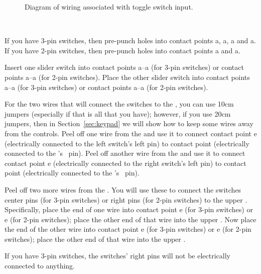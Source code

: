 \begin{figure}[p]
{{        }
    }{}
    \caption{Diagram of wiring associated with toggle switch input.
        \label{fig:switch-diagram}}
\end{figure}

\disconnect\

If you have 3-pin switches, then pre-punch holes into contact points a, a, a and a.
If you have 2-pin switches, then pre-punch holes into contact points a and a.

Insert one slider switch into contact points a--a (for 3-pin switches) or contact points a--a (for 2-pin switches).
Place the other slider switch  into contact points a--a (for 3-pin switches) or contact points a--a (for 2-pin switches).

For the two wires that will connect the switches to the \developmentboard, you can use 10cm jumpers (especially if that is all that you have);
however, if you use 20cm jumpers, then in Section~\ref{sec:keypad} we will show how to keep some wires away from the controls.
Peel off one wire from the \rainbow and use it to connect contact point e (electrically connected to the left switch's left pin) to contact point \mculeftswitchpoint (electrically connected to the \developmentboard's \mculeftswitch\ pin).
Peel off another wire from the \rainbow and use it to connect contact point e (electrically connected to the right switch's left pin) to contact point \mcurightswitchpoint (electrically connected to the \developmentboard's \mcurightswitch\ pin).

Peel off two more wires from the \rainbow.
You will use these to connect the switches center pins (for 3-pin switches) or right pins (for 2-pin switches) to the upper \ground.
Specifically, place the end of one wire into contact point e (for 3-pin switches) or e (for 2-pin switches);
place the other end of that wire into the upper \ground.
Now place the end of the other wire into contact point e (for 3-pin switches) or e (for 2-pin switches);
place the other end of that wire into the upper \ground.

If you have 3-pin switches, the switches' right pins will not be electrically connected to anything.

